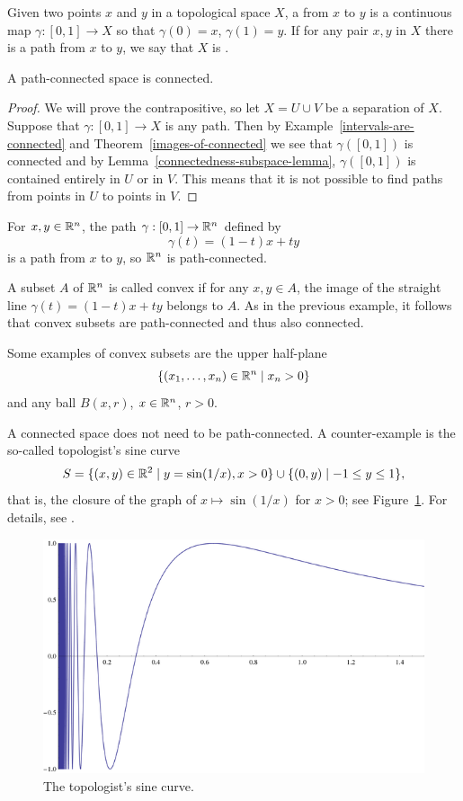 \begin{defn}
  Given two points $x$ and $y$ in a topological space $X$, a  from $x$ to $y$ is a continuous map $\gamma : [0,1] \to X$ so that $\gamma(0) = x$, $\gamma(1) = y$. If for any pair $x,y$ in $X$ there is a path from $x$ to $y$, we say that $X$ is .
\end{defn}
\begin{prop}
  \label{path-connected-implies-connected}
  A path-connected space is connected.
\end{prop}
\begin{proof}
  We will prove the contrapositive, so let $X = U \cup V$ be a separation of $X$. Suppose that $\gamma : [0,1] \to X$ is any path. Then by Example~\ref{intervals-are-connected} and Theorem~\ref{images-of-connected} we see that $\gamma([0,1])$ is connected and by Lemma~\ref{connectedness-subspace-lemma}, $\gamma([0,1])$ is contained entirely in $U$ or in $V$. This means that it is not possible to find paths from points in $U$ to points in $V$.
\end{proof}
\begin{example}
  For $x, y \in \mathbb{R}^n$, the path $\gamma : [0,1] \to \mathbb{R}^n$ defined by
  \[
    \gamma(t) = (1-t)x + ty
  \]
  is a path from $x$ to $y$, so $\mathbb{R}^n$ is path-connected.
\end{example}
\begin{example}
  A subset $A$ of $\mathbb{R}^n$ is called convex if for any $x,y \in A$, the image of the straight line $\gamma(t) = (1-t)x + ty$ belongs to $A$. As in the previous example, it follows that convex subsets are path-connected and thus also connected.
  
  Some examples of convex subsets are the upper half-plane
  \[
    \{(x_1,\dots,x_n) \in \mathbb{R}^n \mid x_n > 0\}
  \]
  and any ball $B(x,r)$, $x \in \mathbb{R}^n$, $r > 0$.
\end{example}
\begin{example}
  A connected space does not need to be path-connected. A counter-example is the so-called topologist's sine curve
  \[
    S = \{(x,y) \in \mathbb{R}^2 \mid y = \sin(1/x), x > 0 \} \cup \{(0,y) \mid -1 \leq y \leq 1 \},
  \]
  that is, the closure of the graph of $x \mapsto \sin(1/x)$ for $x > 0$; see Figure~\ref{sinecurve}. For details, see \cite[\S 24]{Mun}.
  \begin{figure}
    \centering
    \includegraphics[width=.6\linewidth]{images/sinecurve}
    \caption{The topologist's sine curve.}
    \label{sinecurve}
  \end{figure}
\end{example}

